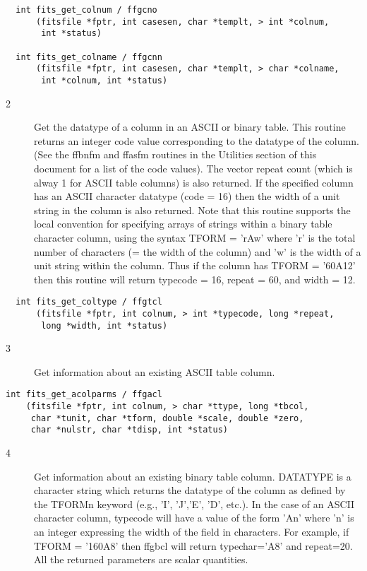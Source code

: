 \begin{verbatim}
  int fits_get_colnum / ffgcno
      (fitsfile *fptr, int casesen, char *templt, > int *colnum,
       int *status)

  int fits_get_colname / ffgcnn
      (fitsfile *fptr, int casesen, char *templt, > char *colname,
       int *colnum, int *status)
\end{verbatim}

\begin{description}
\item[2 ] Get the datatype of a column in an ASCII or binary table.  This
    routine returns an integer code value corresponding to the datatype
    of the column. (See the ffbnfm and ffasfm routines in the Utilities
    section of this document for a list of the code values).  The vector
    repeat count (which is alway 1 for ASCII table columns) is also returned.
    If the specified column has an ASCII character datatype (code = 16) then
    the width of a unit string in the column is also returned.  Note that
    this routine supports the local convention for specifying arrays of
    strings within a binary table character column, using the syntax
    TFORM = 'rAw' where 'r' is the total number of characters (= the width
    of the column) and 'w' is the width of a unit string within the column.
    Thus if the column has TFORM = '60A12' then this routine will return
   typecode = 16, repeat = 60, and width = 12.
\end{description}

\begin{verbatim}
  int fits_get_coltype / ffgtcl
      (fitsfile *fptr, int colnum, > int *typecode, long *repeat,
       long *width, int *status)
\end{verbatim}

\begin{description}
\item[3 ] Get information about an existing ASCII table column.
\end{description}

\begin{verbatim}
int fits_get_acolparms / ffgacl
    (fitsfile *fptr, int colnum, > char *ttype, long *tbcol,
     char *tunit, char *tform, double *scale, double *zero,
     char *nulstr, char *tdisp, int *status)
\end{verbatim}

\begin{description}
\item[4 ] Get information about an existing binary table column. DATATYPE is a
    character string which returns the datatype of the column as defined
    by the TFORMn keyword (e.g., 'I', 'J','E', 'D', etc.).  In the case
    of an ASCII character column, typecode will have a value of the
    form 'An' where 'n' is an integer expressing the width of the field
    in characters.  For example, if TFORM = '160A8' then ffgbcl will return
    typechar='A8' and repeat=20.   All the returned parameters are scalar
   quantities.
\end{description}

